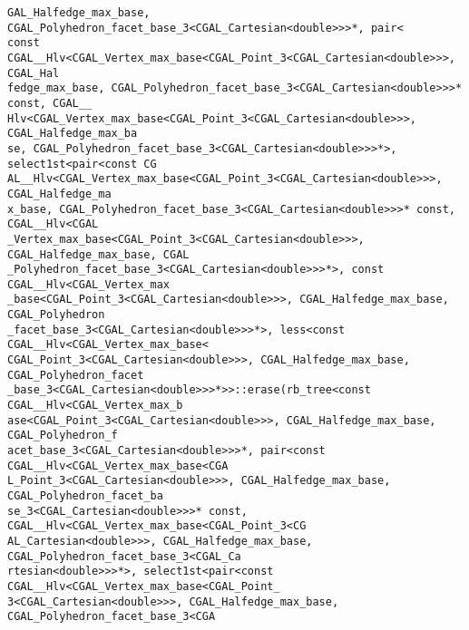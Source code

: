 \begin{titlepage}
\begin{lcTexBlock}
{\verb+GAL_Halfedge_max_base, CGAL_Polyhedron_facet_base_3<CGAL_Cartesian<double>>>*, pair<+\\
\verb+const CGAL__Hlv<CGAL_Vertex_max_base<CGAL_Point_3<CGAL_Cartesian<double>>>, CGAL_Hal+\\
\verb+fedge_max_base, CGAL_Polyhedron_facet_base_3<CGAL_Cartesian<double>>>* const, CGAL__+\\
\verb+Hlv<CGAL_Vertex_max_base<CGAL_Point_3<CGAL_Cartesian<double>>>, CGAL_Halfedge_max_ba+\\
\verb+se, CGAL_Polyhedron_facet_base_3<CGAL_Cartesian<double>>>*>, select1st<pair<const CG+\\
\verb+AL__Hlv<CGAL_Vertex_max_base<CGAL_Point_3<CGAL_Cartesian<double>>>, CGAL_Halfedge_ma+\\
\verb+x_base, CGAL_Polyhedron_facet_base_3<CGAL_Cartesian<double>>>* const, CGAL__Hlv<CGAL+\\
\verb+_Vertex_max_base<CGAL_Point_3<CGAL_Cartesian<double>>>, CGAL_Halfedge_max_base, CGAL+\\
\verb+_Polyhedron_facet_base_3<CGAL_Cartesian<double>>>*>, const CGAL__Hlv<CGAL_Vertex_max+\\
\verb+_base<CGAL_Point_3<CGAL_Cartesian<double>>>, CGAL_Halfedge_max_base, CGAL_Polyhedron+\\
\verb+_facet_base_3<CGAL_Cartesian<double>>>*>, less<const CGAL__Hlv<CGAL_Vertex_max_base<+\\
\verb+CGAL_Point_3<CGAL_Cartesian<double>>>, CGAL_Halfedge_max_base, CGAL_Polyhedron_facet+\\
\verb+_base_3<CGAL_Cartesian<double>>>*>>::erase(rb_tree<const CGAL__Hlv<CGAL_Vertex_max_b+\\
\verb+ase<CGAL_Point_3<CGAL_Cartesian<double>>>, CGAL_Halfedge_max_base, CGAL_Polyhedron_f+\\
\verb+acet_base_3<CGAL_Cartesian<double>>>*, pair<const CGAL__Hlv<CGAL_Vertex_max_base<CGA+\\
\verb+L_Point_3<CGAL_Cartesian<double>>>, CGAL_Halfedge_max_base, CGAL_Polyhedron_facet_ba+\\
\verb+se_3<CGAL_Cartesian<double>>>* const, CGAL__Hlv<CGAL_Vertex_max_base<CGAL_Point_3<CG+\\
\verb+AL_Cartesian<double>>>, CGAL_Halfedge_max_base, CGAL_Polyhedron_facet_base_3<CGAL_Ca+\\
\verb+rtesian<double>>>*>, select1st<pair<const CGAL__Hlv<CGAL_Vertex_max_base<CGAL_Point_+\\
\verb+3<CGAL_Cartesian<double>>>, CGAL_Halfedge_max_base, CGAL_Polyhedron_facet_base_3<CGA+\\
}
\end{lcTexBlock}
\end{titlepage}

